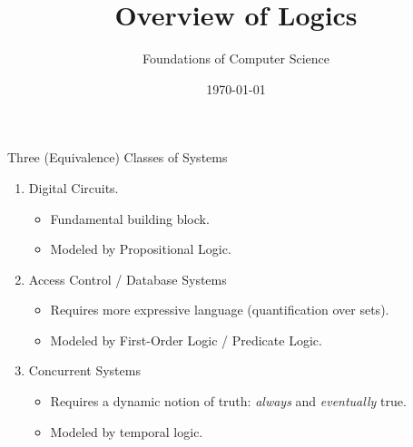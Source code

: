 \documentclass[style=sailor,size=12pt]{powerdot}
\title{Overview of Logics}
\author{Foundations of Computer Science}
\date{\today}
\begin{document}
\maketitle

\begin{wideslide}[bm=,toc=]{Three (Equivalence) Classes of Systems} 

\begin{enumerate}
\item Digital Circuits. 
\begin{itemize}
\item<2-> Fundamental building block.
\item<2-> Modeled by Propositional Logic. 
\end{itemize}
\item Access Control / Database Systems
\begin{itemize}
\item<3-> Requires more expressive language (quantification over sets).
\item<3-> Modeled by First-Order Logic / Predicate Logic. 
\end{itemize}
\item Concurrent Systems 
\begin{itemize}
\item<4-> Requires a dynamic notion of truth: \emph{always} and \emph{eventually} true.
\item<4-> Modeled by temporal logic.
\end{itemize}
\end{enumerate}
\end{wideslide}
\end{document}

